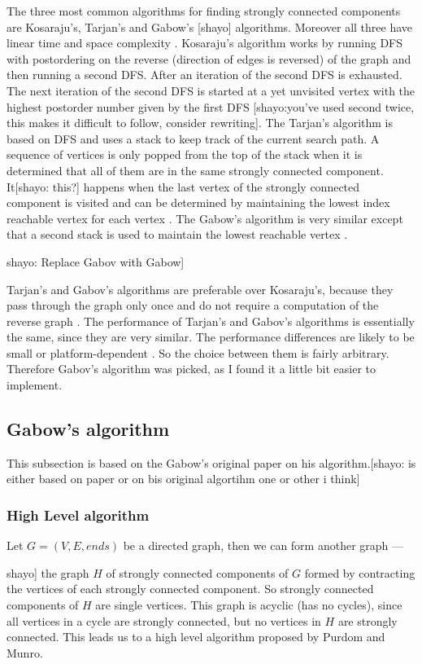 \documentclass{report}
\theoremstyle{plain}
\theoremstyle{definition}
\theoremstyle{remark}
\numberwithin{definition}{chapter}
\numberwithin{example}{chapter}
\numberwithin{figure}{chapter}
\begin{document}
{{The three most common algorithms for finding strongly connected components are Kosaraju's, Tarjan's and Gabow's [shayo] algorithms. Moreover all three have linear time and space complexity \cite{c++_sedgewick}. Kosaraju's algorithm works by running DFS with postordering on the reverse (direction of edges is reversed) of the graph and then running a second DFS. After an iteration of the second DFS is exhausted. The next iteration of the second DFS is started at a yet unvisited vertex with the highest postorder number given by the first DFS \cite{c++_sedgewick} [shayo:you've used second twice, this makes it difficult to follow, consider rewriting]. The Tarjan's algorithm is based on DFS and uses a stack to keep track of the current search path. A sequence of vertices is only popped from the top of the stack when it is determined that all of them are in the same strongly connected component. It[shayo: this?] happens when the last vertex of the strongly connected component is visited and can be determined by maintaining the lowest index  reachable vertex for each vertex \cite{c++_sedgewick}. The Gabow's algorithm is very similar except that a second stack is used to maintain the lowest reachable vertex \cite{c++_sedgewick}. {shayo: Replace Gabov with Gabow]

Tarjan's and Gabov's algorithms are preferable over Kosaraju's, because they pass through the graph only once and do not require a computation of the reverse graph \cite{c++_sedgewick}. The performance of Tarjan's and Gabov's algorithms is essentially the same, since they are very similar. The performance differences are likely to be small or platform-dependent \cite{Gabow2000107}. So the choice between them is fairly arbitrary. Therefore Gabov's algorithm was picked, as I found it a little bit easier to implement.

\subsection{Gabow's algorithm}

This subsection is based on the Gabow's original paper \cite{Gabow2000107} on his algorithm.[shayo: is either based on paper or on bis original algortihm one or other i think]

\subsubsection*{High Level algorithm}

Let $G=(V, E, ends)$ be a directed graph, then we can form another graph ---{shayo] the graph $H$ of strongly connected components of $G$ formed by contracting the vertices of each strongly connected component. So strongly connected components of $H$ are single vertices. This graph is acyclic (has no cycles), since all vertices in a cycle are strongly connected, but no vertices in $H$ are strongly connected. This leads us to a high level algorithm proposed by Purdom and Munro.

}}}}
\end{document}
